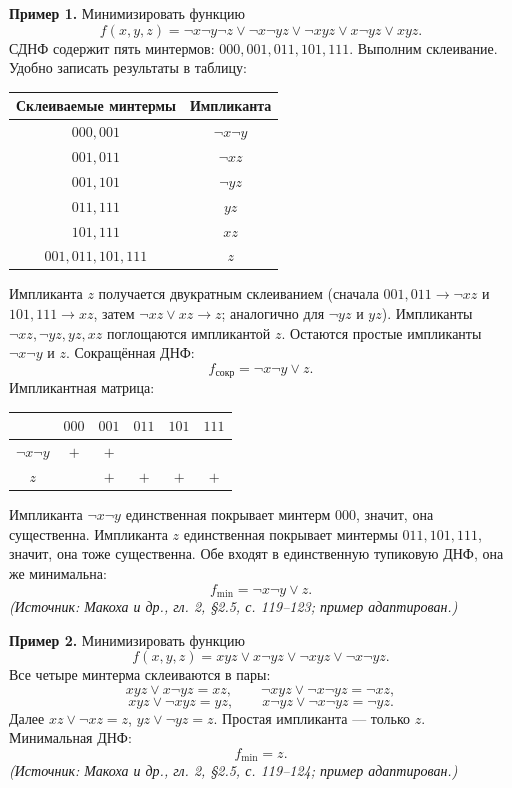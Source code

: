 \documentclass[a4paper,12pt]{article}
\begin{document}
\textbf{Пример 1.} Минимизировать функцию
\[
f(x,y,z)=\neg x\neg y\neg z\lor\neg x\neg yz\lor\neg xyz\lor x\neg yz\lor xyz.
\]
СДНФ содержит пять минтермов: \(000,001,011,101,111\).
Выполним склеивание. Удобно записать результаты в таблицу:
\begin{center}
\begin{tabular}{c|c}
\toprule
Склеиваемые минтермы & Импликанта \\
\midrule
\(000,001\) & \(\neg x\neg y\) \\
\(001,011\) & \(\neg xz\) \\
\(001,101\) & \(\neg yz\) \\
\(011,111\) & \(yz\) \\
\(101,111\) & \(xz\) \\
\(001,011,101,111\) & \(z\) \\
\bottomrule
\end{tabular}
\end{center}
Импликанта \(z\) получается двукратным склеиванием (сначала \(001,011\to\neg xz\) и \(101,111\to xz\), затем \(\neg xz\lor xz\to z\); аналогично для \(\neg yz\) и \(yz\)). Импликанты \(\neg xz,\neg yz,yz,xz\) поглощаются импликантой \(z\). Остаются простые импликанты \(\neg x\neg y\) и \(z\). Сокращённая ДНФ:
\[
f_{\text{сокр}}=\neg x\neg y\lor z.
\]
Импликантная матрица:
\begin{center}
\begin{tabular}{c|ccccc}
\toprule
 & \(000\) & \(001\) & \(011\) & \(101\) & \(111\) \\
\midrule
\(\neg x\neg y\) & \(+\) & \(+\) & & & \\
\(z\) & & \(+\) & \(+\) & \(+\) & \(+\) \\
\bottomrule
\end{tabular}
\end{center}
Импликанта \(\neg x\neg y\) единственная покрывает минтерм \(000\), значит, она существенна. Импликанта \(z\) единственная покрывает минтермы \(011,101,111\), значит, она тоже существенна. Обе входят в единственную тупиковую ДНФ, она же минимальна:
\[
f_{\min}=\neg x\neg y\lor z.
\]
\textit{(Источник: Макоха и др., гл. 2, §2.5, с. 119--123; пример адаптирован.)}

\textbf{Пример 2.} Минимизировать функцию
\[
f(x,y,z)=xyz\lor x\neg yz\lor\neg xyz\lor\neg x\neg yz.
\]
Все четыре минтерма склеиваются в пары:
\[
xyz\lor x\neg yz=xz,\qquad \neg xyz\lor\neg x\neg yz=\neg xz,
\]
\[
xyz\lor\neg xyz=yz,\qquad x\neg yz\lor\neg x\neg yz=\neg yz.
\]
Далее \(xz\lor\neg xz=z\), \(yz\lor\neg yz=z\). Простая импликанта — только \(z\). Минимальная ДНФ:
\[
f_{\min}=z.
\]
\textit{(Источник: Макоха и др., гл. 2, §2.5, с. 119--124; пример адаптирован.)}
\end{document}
